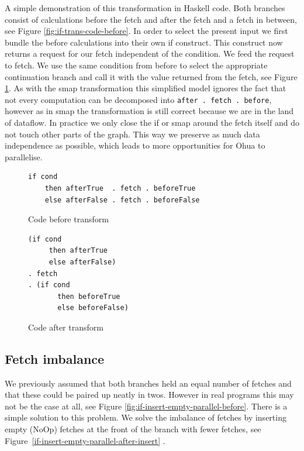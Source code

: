 A simple demonstration of this transformation in Haskell code.
Both branches consist of calculations before the fetch and after the fetch and a fetch in between, see Figure \ref{fig:if-trans-code-before}.
In order to select the present input we first bundle the before calculations into their own if construct.
This construct now returns a request for our fetch independent of the condition.
We feed the request to fetch.
We use the same condition from before to select the appropriate continuation branch and call it with the value returned from the fetch, see Figure \ref{fig:if-trans-code-after}.
As with the smap transformation this simplified model ignores the fact that not every computation can be decomposed into \texttt{after . fetch . before}, however as in smap the transformation is still correct because we are in the land of dataflow.
In practice we only close the if or smap around the fetch itself and do not touch other parts of the graph.
This way we preserve as much data independence as possible, which leads to more opportunities for Ohua to parallelise.

\begin{figure}
\begin{verbatim}
if cond
    then afterTrue  . fetch . beforeTrue
    else afterFalse . fetch . beforeFalse
\end{verbatim}
\caption{Code before transform}
\label{fig:if-trans-code-before}
\begin{verbatim}
(if cond
     then afterTrue
     else afterFalse)
. fetch
. (if cond
       then beforeTrue
       else beforeFalse)
\end{verbatim}
\caption{Code after transform}
\label{fig:if-trans-code-after}
\end{figure}

\subsection{Fetch imbalance}

We previously assumed that both branches held an equal number of fetches and that these could be paired up neatly in twos.
However in real programs this may not be the case at all, see Figure \ref{fig:if-insert-empty-parallel-before}.
There is a simple solution to this problem.
We solve the imbalance of fetches by inserting empty (NoOp) fetches at the front of the branch with fewer fetches, see Figure~\ref{if-insert-empty-parallel-after-insert} .

